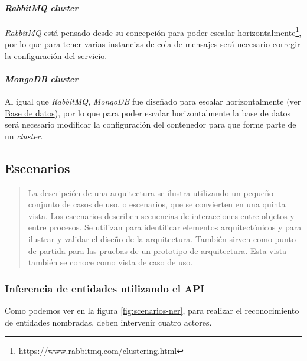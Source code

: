 \documentclass[12pt,a4paper,]{scrartcl}
\let\oldparagraph\paragraph
\renewcommand{\paragraph}[1]{\oldparagraph{#1}\mbox{}}
\begin{document}
\hypertarget{rabbitmq-cluster}{%
\paragraph{\texorpdfstring{\emph{RabbitMQ cluster}}{RabbitMQ cluster}}\label{rabbitmq-cluster}}

\emph{RabbitMQ} está pensado desde su concepción para poder escalar horizontalmente\footnote{\url{https://www.rabbitmq.com/clustering.html}}, por lo que para tener varias instancias de cola de mensajes será necesario corregir la configuración del servicio.

\hypertarget{mongodb-cluster}{%
\paragraph{\texorpdfstring{\emph{MongoDB cluster}}{MongoDB cluster}}\label{mongodb-cluster}}

Al igual que \emph{RabbitMQ}, \emph{MongoDB} fue diseñado para escalar horizontalmente (ver \protect\hyperlink{MongoDBDev}{Base de datos}), por lo que para poder escalar horizontalmente la base de datos será necesario modificar la configuración del contenedor para que forme parte de un \emph{cluster}.

\hypertarget{escenarios}{%
\subsection{Escenarios}\label{escenarios}}

\begin{quote}
La descripción de una arquitectura se ilustra utilizando un pequeño conjunto de casos de uso, o escenarios, que se convierten en una quinta vista.
Los escenarios describen secuencias de interacciones entre objetos y entre procesos.
Se utilizan para identificar elementos arquitectónicos y para ilustrar y validar el diseño de la arquitectura.
También sirven como punto de partida para las pruebas de un prototipo de arquitectura.
Esta vista también se conoce como vista de caso de uso.
\end{quote}

\hypertarget{inferencia-de-entidades-utilizando-el-api}{%
\subsubsection{Inferencia de entidades utilizando el API}\label{inferencia-de-entidades-utilizando-el-api}}

Como podemos ver en la figura \ref{fig:scenarios-ner}, para realizar el reconocimiento de entidades nombradas, deben intervenir cuatro actores.
\end{document}
